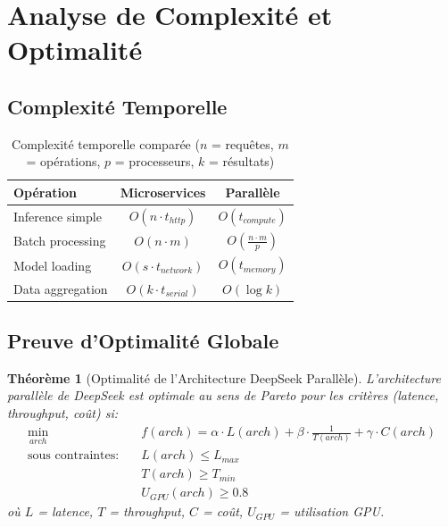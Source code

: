 \documentclass[12pt,a4paper]{article}
\newtheorem{theorem}{Théorème}
\begin{document}
\section{Analyse de Complexité et Optimalité}

\subsection{Complexité Temporelle}

\begin{table}[H]
\centering
\begin{tabular}{|l|c|c|}
\hline
\textbf{Opération} & \textbf{Microservices} & \textbf{Parallèle} \\
\hline
Inference simple & $O(n \cdot t_{http})$ & $O(t_{compute})$ \\
\hline
Batch processing & $O(n \cdot m)$ & $O(\frac{n \cdot m}{p})$ \\
\hline
Model loading & $O(s \cdot t_{network})$ & $O(t_{memory})$ \\
\hline
Data aggregation & $O(k \cdot t_{serial})$ & $O(\log k)$ \\
\hline
\end{tabular}
\caption{Complexité temporelle comparée ($n$ = requêtes, $m$ = opérations, $p$ = processeurs, $k$ = résultats)}
\end{table}

\subsection{Preuve d'Optimalité Globale}

\begin{theorem}[Optimalité de l'Architecture DeepSeek Parallèle]
L'architecture parallèle de DeepSeek est optimale au sens de Pareto pour les critères (latence, throughput, coût) si:
\begin{align*}
\min_{arch} \quad & f(arch) = \alpha \cdot L(arch) + \beta \cdot \frac{1}{T(arch)} + \gamma \cdot C(arch) \\
\text{sous contraintes:} \quad & L(arch) \leq L_{max} \\
& T(arch) \geq T_{min} \\
& U_{GPU}(arch) \geq 0.8
\end{align*}
où $L$ = latence, $T$ = throughput, $C$ = coût, $U_{GPU}$ = utilisation GPU.
\end{theorem}
\end{document}
